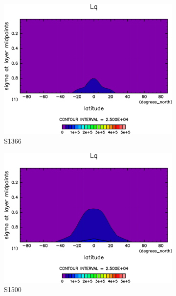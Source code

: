 \documentclass[body]{subfiles}
\begin{document}
\begin{figure}[t]
	\centering
	\begin{subfigure}{.4\textwidth}
		\centering
		\includegraphics[width=\columnwidth]{S1366/Lq,time=14600:14965-crop-rotate.pdf}
		\caption{S1366}\label{LqS1366}
	\end{subfigure}
	\begin{subfigure}{.4\textwidth}
		\centering
		\includegraphics[width=\columnwidth]{S1500/Lq,time=3650:4015-crop-rotate.pdf}
		\caption{S1500}\label{LqS1500}
	\end{subfigure}
	\begin{subfigure}{.4\textwidth}
		\centering

\end{subfigure}
\end{figure}
\end{document}
